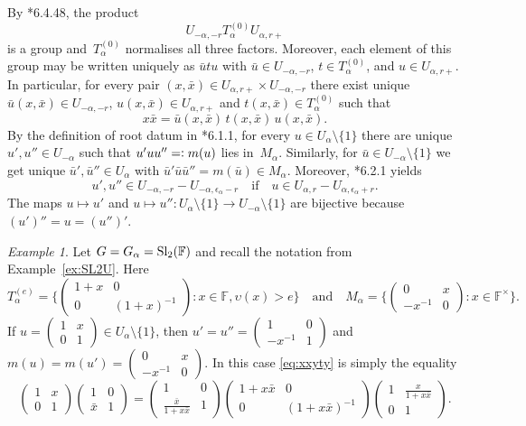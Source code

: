 \documentclass{amsart}
\theoremstyle{remark}
\newtheorem{example}[theorem]{Example}
\theoremstyle{definition}
\newcommand*{\eqdef}{\mathrel{=\vcentcolon}}%
\newcommand*{\F}{\mathbb F}%
\newcommand*{\valu}{\upsilon}%
\newcommand*{\Sl}{\textup{Sl}}%
\newcommand*{\Un}{U}%
\newcommand*{\epal}{\epsilon_\alpha}%
\newcommand*{\twomatrix}[4]{\begin{pmatrix}#1&#2\\#3&#4\end{pmatrix}}
\newcommand*{\stwomatrix}[4]{\left(\begin{smallmatrix}#1&#2\\#3&#4\end{smallmatrix}\right)}
\begin{document}
By \cite{Bruhat-Tits:Reductifs_I}*{6.4.48}, the product
\begin{equation}
  \label{eq:Galphars}
  \Un_{-\alpha,-r} T_\alpha^{(0)} \Un_{\alpha,r+}
\end{equation}
is a group and~\(T_\alpha^{(0)}\) normalises all three factors.  Moreover, each element of this group may be written uniquely as \(\bar{u} t u\) with \(\bar{u} \in \Un_{-\alpha,-r}\), \(t \in T_\alpha^{(0)}\), and \(u \in \Un_{\alpha,r+}\).  In particular, for every pair \((x,\bar{x}) \in \Un_{\alpha,r+} \times \Un_{-\alpha,-r}\) there exist unique \(\bar{u}(x,\bar{x}) \in \Un_{-\alpha,-r}\), \(u (x,\bar{x}) \in \Un_{\alpha,r+}\) and \(t (x,\bar{x}) \in T_\alpha^{(0)}\) such that
\begin{equation}
  \label{eq:xxyty}
  x \bar{x} = \bar{u}(x,\bar{x}) \, t(x,\bar{x}) \, u(x,\bar{x}).
\end{equation}
By the definition of root datum in \cite{Bruhat-Tits:Reductifs_I}*{6.1.1}, for every \(u \in \Un_\alpha \setminus \{1\}\) there are unique \(u', u'' \in \Un_{-\alpha}\) such that \(u' u u'' \eqdef m(u)\) lies in~\(M_\alpha\).  Similarly, for \(\bar u \in \Un_{-\alpha} \setminus \{1\}\) we get unique \(\bar{u}', \bar{u}'' \in \Un_{\alpha}\) with \(\bar{u}' \bar{u} \bar{u}'' = m(\bar{u}) \in M_\alpha\).  Moreover, \cite{Bruhat-Tits:Reductifs_I}*{6.2.1} yields
\begin{equation}
  \label{eq:u''}
  u', u'' \in \Un_{-\alpha,-r} - \Un_{-\alpha, \epal -r} \quad\text{if}\quad
  u \in \Un_{\alpha,r} - \Un_{\alpha, \epal + r}.
\end{equation}
The maps \(u \mapsto u'\) and \(u \mapsto u''\colon \Un_{\alpha} \setminus \{1\} \to \Un_{-\alpha} \setminus \{ 1 \}\) are bijective because \((u')'' = u = (u'')'\).
\begin{example}
  \label{ex:SL2T}
  Let \(G = G_\alpha = \Sl_2 (\F)\) and recall the notation from Example~\ref{ex:SL2U}.  Here
  \[
  T_\alpha^{(e)} = \bigl\{ \stwomatrix{1+x}{0}{0}{(1+x)^{-1}} : x \in \F, \valu (x) > e \bigr\}
  \quad \text{and} \quad
  M_\alpha = \bigl\{ \stwomatrix{0}{x}{-x^{-1}}{0} : x \in \F^\times \bigr\}.
  \]
  If \(u = \stwomatrix{1}{x}{0}{1} \in \Un_{\alpha} \setminus \{1\}\), then \(u' = u'' = \stwomatrix{1}{0}{-x^{-1}}{1}\) and \(m(u) = m(u') = \stwomatrix{0}{x}{-x^{-1}}{0}\).  In this case \eqref{eq:xxyty} is simply the equality
  \[
  \twomatrix{1}{x}{0}{1} \twomatrix{1}{0}{\bar x}{1} =
  \twomatrix{1}{0}{\frac{\bar x}{1+x \bar x}}{1} \twomatrix{1+x \bar x}{0}{0}{(1+ x \bar x)^{-1}}
  \twomatrix{1}{\frac{x}{1+x \bar x}}{0}{1}.
  \]
\end{example}
\end{document}
